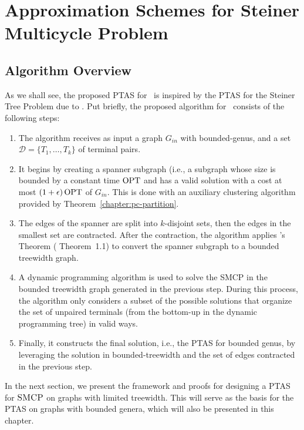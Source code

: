 \chapter{Approximation Schemes for Steiner Multicycle Problem}
\label{chapter:apx_schemes_for_smcp}

\section{Algorithm Overview}

As we shall see, the proposed PTAS for \steinercycle\ is inspired by the PTAS for the Steiner Tree Problem due to \cite{Bateni}. Put briefly, the proposed algorithm for \steinercycle\ consists of the following steps:

\begin{enumerate}
    \item The algorithm receives as input a graph \(G_{in}\) with bounded-genus, and a set \(\mathcal{D} = \{T_1, \dots, T_k\}\) of terminal pairs.

    \item It begins by creating a spanner subgraph (i.e., a subgraph whose size is bounded by a constant time \(\operatorname{\textrm{OPT}}\) and has a valid solution with a cost at most \((1 + \epsilon) \operatorname{\textrm{OPT}}\) of \(G_{in}\). This is done with an auxiliary clustering algorithm provided by Theorem~\ref{chapter:pc-partition}.
    
    \item The edges of the spanner are split into \(k\)-disjoint sets, then the edges in the smallest set are contracted. After the contraction, the algorithm applies \citeauthor{Demaine2010}'s Theorem (\cite{Demaine2010} Theorem~1.1) to convert the spanner subgraph to a bounded treewidth graph.

    \item A dynamic programming algorithm is used to solve the SMCP in the bounded treewidth graph generated in the previous step. During this process, the algorithm only considers a subset of the possible solutions that organize the set of unpaired terminals (from the bottom-up in the dynamic programming tree) in valid ways.

    \item Finally, it constructs the final solution, i.e., the PTAS for bounded genus, by leveraging the solution in bounded-treewidth and the set of edges contracted in the previous step.
\end{enumerate}

In the next section, we present the framework and proofs for designing a PTAS for \(\textsc{SMCP}\) on graphs with limited treewidth. This will serve as the basis for the PTAS on graphs with bounded genera, which will also be presented in this chapter.

